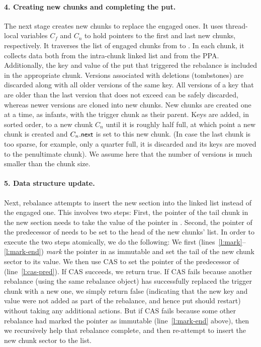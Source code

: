 \paragraph{4. Creating new chunks and completing the put.}

The next stage creates new chunks to replace the engaged ones. 
It uses thread-local variables $C_f$ and  $C_n$  to hold pointers to the first and last new chunks, respectively.
It traverses the list of engaged chunks from  to .
In each chunk, it collects data both from the intra-chunk linked list and from the PPA. Additionally, 
the key and value of the put that triggered the rebalance is included in the appropriate chunk. 
Versions associated with deletions (tombstones) are discarded along with all older versions of the same key.
All versions of a key that are older than the last version that does not exceed  can be safely discarded, whereas
newer versions are cloned into new chunks. New chunks are created one at a time, as infants, with the trigger chunk as their parent.
Keys are added, in sorted order, to a new chunk $C_n$ until it is roughly half full, at which point a new chunk  is created
and $C_n.\code{next}$ is set to this new chunk. (In case the last chunk is too sparse, for example, only a quarter full, it is discarded and its keys are moved to the  penultimate chunk).
We assume here that the number of versions is much smaller than the chunk size.

\paragraph{5. Data structure update.}

Next, rebalance attempts to insert the new section into the linked list instead of the engaged one.
This involves two steps: First, the  pointer of the tail chunk in the new section needs to take the value of
the  pointer in . Second, the  pointer of the predecessor of  needs to be set to the head of
the new chunks' list. In order to execute the two steps atomically, we do the following:
We first (lines~\ref{l:mark}--\ref{l:mark-end}) \emph{mark} the  pointer in  as immutable and 
set the tail of the new chunk sector to its value. 
We then use CAS to set the  pointer of the predecessor of  (line~\ref{l:cas-pred}).
If CAS succeeds, we return true.
If CAS fails because another rebalance (using the same rebalance object) has successfully replaced the trigger chunk with a new one, we simply return false (indicating that the new key and value were not added as part of the rebalance, and hence put should restart) 
without taking any additional actions. But if CAS fails because some other rebalance had marked the  pointer as immutable (line~\ref{l:mark-end} above), then we recursively help that rebalance complete, and then re-attempt to insert the new chunk sector to the list.

